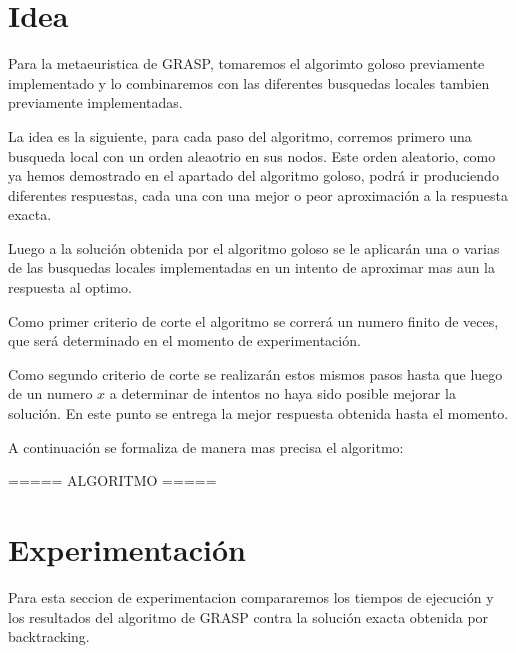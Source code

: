 \section{Idea}

Para la metaeuristica de GRASP, tomaremos el algorimto goloso previamente implementado y lo combinaremos con las diferentes busquedas locales tambien previamente implementadas.

La idea es la siguiente, para cada paso del algoritmo, corremos primero una busqueda local con un orden aleaotrio en sus nodos. Este orden aleatorio, como ya hemos demostrado en el apartado del algoritmo goloso, podrá ir produciendo diferentes respuestas, cada una con una mejor o peor aproximación a la respuesta exacta.

Luego a la solución obtenida por el algoritmo goloso se le aplicarán una o varias de las busquedas locales implementadas en un intento de aproximar mas aun la respuesta al optimo.

Como primer criterio de corte el algoritmo se correrá un numero finito de veces, que será determinado en el momento de experimentación.

Como segundo criterio de corte se realizarán estos mismos pasos hasta que luego de un numero $x$ a determinar de intentos no haya sido posible mejorar la solución. En este punto se entrega la mejor respuesta obtenida hasta el momento.

A continuación se formaliza de manera mas precisa el algoritmo:


===== ALGORITMO =====


\section{Experimentación}

Para esta seccion de experimentacion compararemos los tiempos de ejecución y los resultados del algoritmo de GRASP contra la solución exacta obtenida por backtracking.


